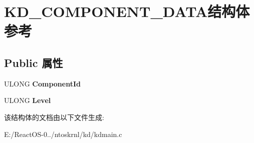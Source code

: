 \hypertarget{struct_k_d___c_o_m_p_o_n_e_n_t___d_a_t_a}{}\section{K\+D\+\_\+\+C\+O\+M\+P\+O\+N\+E\+N\+T\+\_\+\+D\+A\+T\+A结构体 参考}
\label{struct_k_d___c_o_m_p_o_n_e_n_t___d_a_t_a}
\subsection*{Public 属性}
\begin{DoxyCompactItemize}
\item 
\mbox{\label{struct_k_d___c_o_m_p_o_n_e_n_t___d_a_t_a_a1313b1fc4df127e3e191b4a93c838423}} 
U\+L\+O\+NG {\bfseries Component\+Id}
\item 
\mbox{\label{struct_k_d___c_o_m_p_o_n_e_n_t___d_a_t_a_abe7d7aaa663ac9984d0a2f8ff282f011}} 
U\+L\+O\+NG {\bfseries Level}
\end{DoxyCompactItemize}


该结构体的文档由以下文件生成\+:\begin{DoxyCompactItemize}
\item 
E\+:/\+React\+O\+S-\/0../ntoskrnl/kd/kdmain.\+c\end{DoxyCompactItemize}
